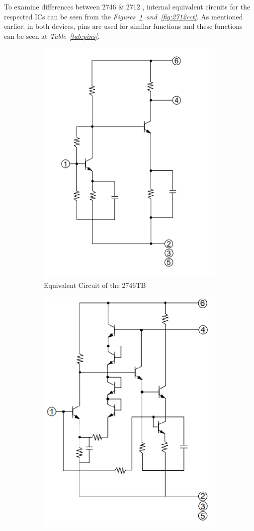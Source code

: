 	To examine differences between 2746 \& 2712 , internal equivalent circuits for the respected ICs can be seen from the \textit{Figures~\ref{fig:2746cct}~and~\ref{fig:2712cct}}. As mentioned earlier, in both devices, pins are used for similar functions and these functions can be seen at \textit{Table~\ref{tab:pins}}.  
	

	
\begin{figure}[H]
	\setlength{\unitlength}{\textwidth} 
	\centering
	\begin{subfigure}{.5\textwidth}
  		\centering
  		\includegraphics[width=0.3\unitlength]{2746_cct}
  		\caption{\label{fig:2746cct}Equivalent Circuit of the 2746TB}
	\end{subfigure}%
	\begin{subfigure}{.5\textwidth}
  		\centering
		\includegraphics[width=0.3\unitlength]{2712_cct}

\end{subfigure}
\end{figure}
